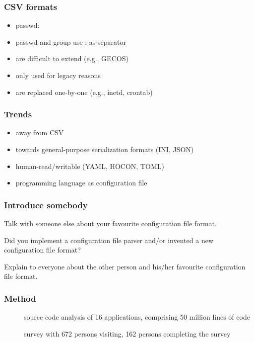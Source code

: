 \begin{frame}
	\frametitle{CSV formats}
	\begin{itemize}
	\item passwd: 
	\item passwd and group use : as separator
	\item are difficult to extend (e.g., GECOS)
	\item only used for legacy reasons
	\item are replaced one-by-one (e.g., inetd, crontab)
	\end{itemize}
\end{frame}

\begin{frame}
	\frametitle{Trends}
	\begin{itemize}
	\item away from CSV
	\item towards general-purpose serialization formats (INI, JSON)
	\item human-read/writable (YAML, HOCON, TOML)
	\item programming language as configuration file
	\end{itemize}
\end{frame}

\begin{assignment}
	\frametitle{Introduce somebody}
	\begin{task}
	Talk with someone else about your favourite configuration file format.
	\end{task}

	\begin{task}
	Did you implement a configuration file parser and/or invented a new configuration file format?
	\end{task}

	\begin{task}
	Explain to everyone about the other person and his/her favourite configuration file format.
	\end{task}
\end{assignment}

\begin{frame}
	\frametitle{Method}
	\begin{description}
	\item[\methodSource{}] source code analysis of 16 applications, comprising 50 million lines of code~\cite{raab2017challenges}
	\item[\methodQuestion{}] survey with 672 persons visiting, 162 persons completing the survey~\cite{raab2017challenges}
	\end{description}
\end{frame}

